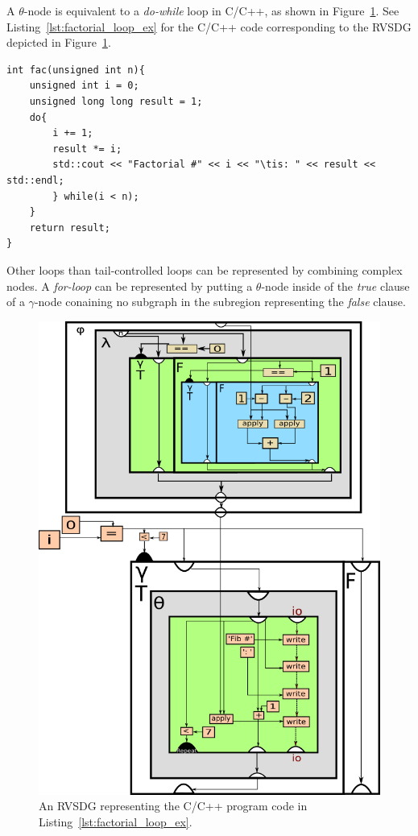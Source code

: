 \begin{itemize}
A $\theta$-node is equivalent to a \textit{do-while} loop in C/C++, as shown in
Figure~\ref{fig:factorial_loop_ex}. See Listing~\ref{lst:factorial_loop_ex} for
the C/C++ code corresponding to the RVSDG depicted in
Figure~\ref{fig:factorial_loop_ex}.

\begin{lstlisting}[label={lst:factorial_loop_ex}, style=global_customcpp,
caption={C/C++ code corresponding to the RVSDG subgraph in
Figure~\ref{fig:factorial_loop_ex}.}]
int fac(unsigned int n){
	unsigned int i = 0;
	unsigned long long result = 1;
	do{
		i += 1;
		result *= i;
		std::cout << "Factorial #" << i << "\tis: " << result << std::endl;
		} while(i < n);
	}
	return result;
}
\end{lstlisting}
\vspace{-4\parskip} %

Other loops than tail-controlled loops can be represented by combining complex
nodes. A \textit{for-loop} can be represented by putting a $\theta$-node inside
of the \textit{true} clause of a $\gamma$-node conaining no subgraph in the
subregion representing the \textit{false} clause.

\begin{figure}[h!]
	\centering
	\includegraphics[width=\textwidth]{figures/for-loop-printf-rec_fib-example}
	\caption{An RVSDG representing the C/C++  program code in
Listing~\ref{lst:factorial_loop_ex}.}
	\label{fig:factorial_loop_ex}
\end{figure}


\end{itemize}
